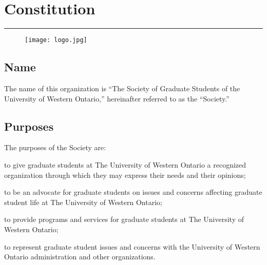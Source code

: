 \chapter{Constitution}
\rule{\textwidth}{0.5pt}\vspace*{--\baselineskip}\vspace{3.2pt} %
\vfill


\begin{figure}
\centering
\texttt{[image: logo.jpg]}\\[1cm]
\end{figure}




\newpage


\section{Name}

The name of this organization is ``The Society of Graduate Students of the University of Western Ontario,'' hereinafter referred to as the ``Society.''  
 \newpage

\section{Purposes}

The purposes of the Society are:

	\begin{longenum}[ label*=\thesection.\arabic*., align=left]

 \item to give graduate students at The University of Western Ontario a recognized organization through which they may express their needs and their opinions;

 \item to be an advocate for graduate students on issues and concerns affecting graduate student life at The University of Western Ontario; 

 \item to provide programs and services for graduate students at The University of Western Ontario; 

 \item to represent graduate student issues and concerns with the University of Western Ontario administration and other organizations.
   \end{longenum}

